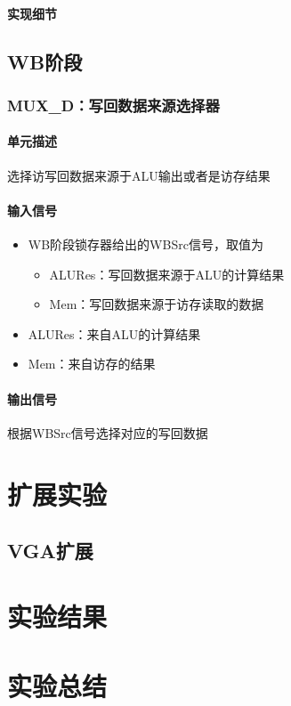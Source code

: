 \documentclass{article}
\begin{document}
\paragraph{实现细节}

\subsection{WB阶段}
		
\subsubsection{MUX\_D：写回数据来源选择器}
		
\paragraph{单元描述}
选择访写回数据来源于ALU输出或者是访存结果
		
\paragraph{输入信号}
\begin{itemize}
\item WB阶段锁存器给出的WBSrc信号，取值为
		\begin{itemize}
			\item ALURes：写回数据来源于ALU的计算结果
			\item Mem：写回数据来源于访存读取的数据
		\end{itemize}
\item ALURes：来自ALU的计算结果
\item Mem：来自访存的结果
\end{itemize}
\paragraph{输出信号}
根据WBSrc信号选择对应的写回数据
		
		

		
\section{扩展实验}
		
\subsection{VGA扩展}
		
\section{实验结果}
		
\section{实验总结}







\end{document}

